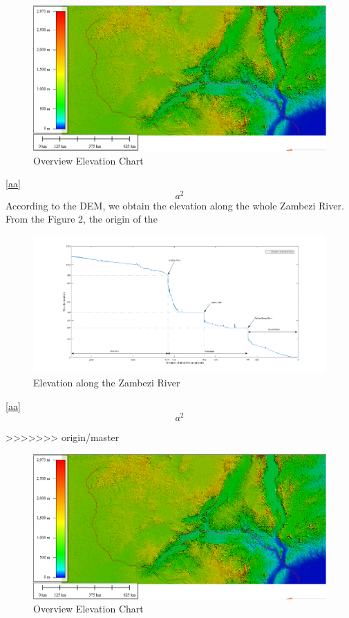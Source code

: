 \documentclass{mcmthesis}
\begin{document}
\begin{figure}[h]
\small
\centering
\includegraphics[width=14cm]{./figures/Sensing_Figure.png}
\caption{Overview Elevation Chart} \label{fig:Fig1}
\end{figure}
\lipsum[8] \eqref{aa}
\begin{equation}
a^2 \label{aa}
\end{equation}
According to the DEM, we obtain the elevation along the whole Zambezi River. From the Figure 2, the origin of the  

\begin{figure}[h]
\small
\centering
\includegraphics[width=14cm]{./figures/dis_alti_v2.png}
\caption{Elevation along the Zambezi River} \label{fig:Fig2}
\end{figure}
\lipsum[8] \eqref{aa}
\begin{equation}
a^2 \label{aa}
\end{equation}


>>>>>>> origin/master

\begin{figure}[h]
\small
\centering
\includegraphics[width=14cm]{./figures/Sensing_Figure.png}
\caption{Overview Elevation Chart} \label{fig:Fig1}
\end{figure}
\end{document}
